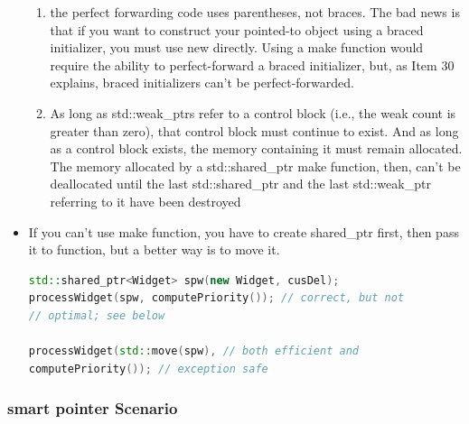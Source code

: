 \documentclass[a4paper,12pt,twoside]{book}
\begin{document}
\begin{itemize}
\begin{enumerate}
\item the perfect forwarding code uses parentheses, not braces. The bad news is that if you want to construct your pointed-to object using a braced initializer, you must use new directly. Using a make function would require the ability to perfect-forward a braced initializer, but, as Item 30 explains, braced initializers can't be perfect-forwarded.

\item As long as std::weak\_ptrs refer to a control block (i.e., the weak count is greater
than zero), that control block must continue to exist. And as long as a control block
exists, the memory containing it must remain allocated. The memory allocated by a
std::shared\_ptr make function, then, can't be deallocated until the last
std::shared\_ptr and the last std::weak\_ptr referring to it have been destroyed
\end{enumerate}

\item If you can't use make function, you have to create shared\_ptr first, then pass it to function, but a better way is to move it.
\begin{lstlisting}[frame=single, language=c++]
std::shared_ptr<Widget> spw(new Widget, cusDel);
processWidget(spw, computePriority()); // correct, but not
// optimal; see below

processWidget(std::move(spw), // both efficient and
computePriority()); // exception safe
\end{lstlisting}

\end{itemize}


\subsubsection{smart pointer Scenario}
\end{document}
